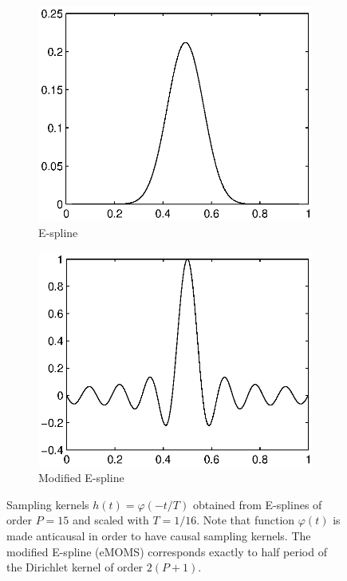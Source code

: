 \documentclass{article}
\providecommand{\red}[1]{\textcolor{red}{#1}}
\begin{document}
\begin{figure}[t]
\centering
\begin{subfigure}{.22\textwidth}
\includegraphics[width=\linewidth]{figures/espline_P15}
\caption{E-spline}
\end{subfigure}
\begin{subfigure}{.22\textwidth}
\includegraphics[width=\linewidth]{figures/modif_espline_P15}
\caption{Modified E-spline}
\end{subfigure}
\caption{Sampling kernels $h(t)=\varphi(-t/T)$ obtained from E-splines of order $P=15$ 
and scaled with $T=1/16$. Note that function $\varphi(t)$ is made anticausal in order
to have causal sampling kernels. 
The modified E-spline (eMOMS) corresponds exactly to half period of the Dirichlet kernel of order $2(P+1)$.}
\label{fig:kernels}
\end{figure}
\end{document}
